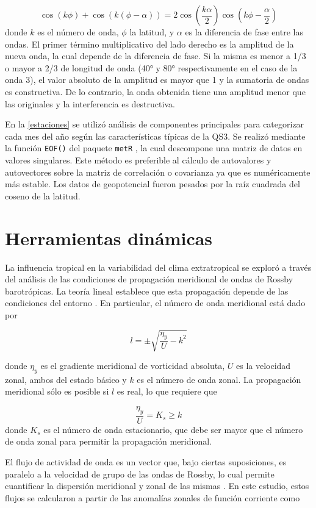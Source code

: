\documentclass[spanish,a4paper,12pt,oneside]{book}
\begin{document}
\[
\cos\left (k\phi \right) + \cos(k(\phi - \alpha)) = 2\cos\left( \frac{k\alpha}{2} \right)\cos\left( k\phi - \frac{\alpha}{2}\right) 
\] donde \(k\) es el número de onda, \(\phi\) la latitud, y \(\alpha\)
es la diferencia de fase entre las ondas. El primer término
multiplicativo del lado derecho es la amplitud de la nueva onda, la cual
depende de la diferencia de fase. Si la misma es menor a 1/3 o mayor a
2/3 de longitud de onda (40° y 80° respectivamente en el caso de la onda
3), el valor absoluto de la amplitud es mayor que 1 y la sumatoria de
ondas es constructiva. De lo contrario, la onda obtenida tiene una
amplitud menor que las originales y la interferencia es destructiva.

En la \autoref{estaciones} se utilizó análisis de componentes
principales para categorizar cada mes del año según las características
típicas de la QS3. Se realizó mediante la función \texttt{EOF()} del
paquete \texttt{metR} \citep{R-metR}, la cual descompone una matriz de
datos en valores singulares. Este método es preferible al cálculo de
autovalores y autovectores sobre la matriz de correlación o covarianza
ya que es numéricamente más estable. Los datos de geopotencial fueron
pesados por la raíz cuadrada del coseno de la latitud.

\section*{Herramientas dinámicas}

La influencia tropical en la variabilidad del clima extratropical se
exploró a través del análisis de las condiciones de propagación
meridional de ondas de Rossby barotrópicas. La teoría lineal establece
que esta propagación depende de las condiciones del entorno
\citep{James}. En particular, el número de onda meridional está dado por

\[
l = \pm \sqrt{\frac{\eta_{y}}{U} - k^2}
\]

donde \(\eta_{y}\) es el gradiente meridional de vorticidad absoluta,
\(U\) es la velocidad zonal, ambos del estado básico y \(k\) es el
número de onda zonal. La propagación meridional sólo es posible si \(l\)
es real, lo que requiere que

\[
\frac{\eta_{y}}{U} = K_s \ge k 
\] donde \(K_s\) es el número de onda estacionario, que debe ser mayor
que el número de onda zonal para permitir la propagación meridional.

El flujo de actividad de onda es un vector que, bajo ciertas
suposiciones, es paralelo a la velocidad de grupo de las ondas de
Rossby, lo cual permite cuantificar la dispersión meridional y zonal de
las mismas \citep{James}. En este estudio, estos flujos se calcularon a
partir de las anomalías zonales de función corriente como
\end{document}
